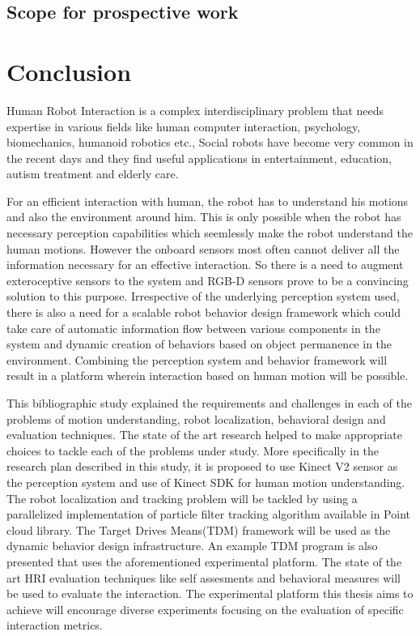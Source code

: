 \subsection{Scope for prospective work}
  

\section{Conclusion} %
	Human Robot Interaction is a complex interdisciplinary problem that needs expertise in various fields like human computer interaction, psychology, biomechanics, humanoid robotics etc., Social robots have become very common in the recent days and they find useful applications in entertainment, education, autism treatment and elderly care. 
	
	For an efficient interaction with human, the robot has to understand his motions and also the environment around him. This is only possible when the robot has necessary perception capabilities which seemlessly make the robot understand the human motions. However the onboard sensors most often cannot deliver all the information necessary for an effective interaction. So there is a need to augment exteroceptive sensors to the system and RGB-D sensors prove to be a convincing solution to this purpose. Irrespective of the underlying perception system used, there is also a need for a scalable robot behavior design framework which could take care of automatic information flow between various components in the system and dynamic creation of behaviors based on object permanence in the environment. Combining the perception system and behavior framework will result in a platform wherein interaction based on human motion will be possible. 
	
	This bibliographic study explained the requirements and challenges in each of the problems of motion understanding, robot localization, behavioral design and evaluation techniques. The state of the art research helped to make appropriate choices to tackle each of the problems under study. More specifically in the research plan described in this study, it is proposed to use Kinect V2 sensor as the perception system and use of Kinect SDK for human motion understanding. The robot localization and tracking problem will be tackled by using a parallelized implementation of particle filter tracking algorithm available in Point cloud library. The Target Drives Means(TDM) framework will be used as the dynamic behavior design infrastructure. An example TDM program is also presented that uses the aforementioned experimental platform. The state of the art HRI evaluation techniques like self assesments and behavioral measures will be used to evaluate the interaction. The experimental platform this thesis aims to achieve will encourage diverse experiments focusing on the evaluation of specific interaction metrics.